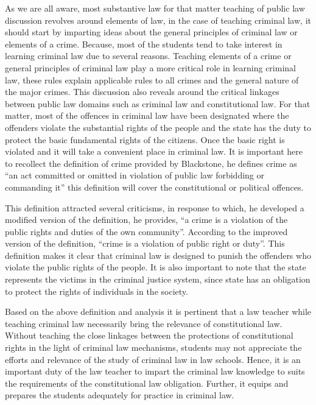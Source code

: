 \begin{multicols}{2}
\noi
As we are all aware, most substantive law for that matter teaching of public law
discussion revolves around elements of law, in the case of teaching criminal law, it
should start by imparting ideas about the general principles of criminal law or
elements of a crime. Because, most of the students tend to take interest in learning
criminal law due to several reasons. Teaching elements of a crime or general
principles of criminal law play a more critical role in learning criminal law, these
rules explain applicable rules to all crimes and the general nature of the major crimes.
This discussion also reveals around the critical linkages between public law domains
such as criminal law and constitutional law. For that matter, most of the offences in
criminal law have been designated where the offenders violate the substantial rights
of the people and the state has the duty to protect the basic fundamental rights of the
citizens. Once the basic right is violated and it will take a convenient place in criminal
law. It is important here to recollect the definition of crime provided by Blackstone,
he defines crime as “an act committed or omitted in violation of public law forbidding
or commanding it” this definition will cover the constitutional or political offences.

\noi
This definition attracted several criticisms, in response to which, he developed a
modified version of the definition, he provides, “a crime is a violation of the public
rights and duties of the own community”. According to the improved version of the
definition, “crime is a violation of public right or duty”. This definition makes it clear
that criminal law is designed to punish the offenders who violate the public rights of
the people. It is also important to note that the state represents the victims in the
criminal justice system, since state has an obligation to protect the rights of
individuals in the society.

\noi
Based on the above definition and analysis it is pertinent that a law teacher while
teaching criminal law necessarily bring the relevance of constitutional law. Without
teaching the close linkages between the protections of constitutional rights in the light
of criminal law mechanisms, students may not appreciate the efforts and relevance of
the study of criminal law in law schools. Hence, it is an important duty of the law
teacher to impart the criminal law knowledge to suits the requirements of the constitutional law obligation. Further, it equips and prepares the students adequately for practice in criminal law.


\end{multicols}
